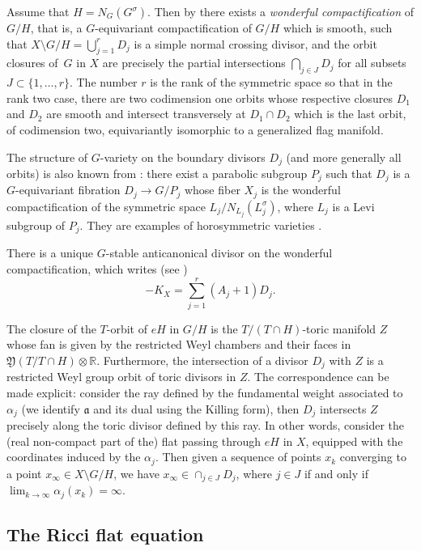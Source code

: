 \documentclass[JEP,XML,SOM,Unicode, NoEqCountersInSection, NoFloatCountersInSection]{cedram}
\theoremstyle{plain}
\theoremstyle{definition}
\begin{document}
Assume that $H=N_G(G^{\sigma})$. Then by \cite{DCP83} there exists a \emph{wonderful compactification} of
$G/H$, that is, a $G$-equivariant compactification of $G/H$ which is smooth, such that
$X\setminus G/H= \bigcup_{j=1}^r D_j$ is a simple normal crossing divisor, and
the orbit closures of~$G$ in $X$ are precisely the partial intersections $\bigcap_{j\in J} D_j$
for all subsets $J\subset \{1,\ldots,r\}$.
The number $r$ is the rank of the symmetric space so that in the rank two case,
there are two codimension one orbits whose respective closures $D_1$ and $D_2$ are smooth and
intersect transversely at $D_1\cap D_2$ which is the last orbit, of codimension two, equivariantly
isomorphic to a generalized flag manifold.

The structure of $G$-variety on the boundary divisors $D_j$ (and more generally all orbits)
is also known from \cite{DCP83}: there exist a parabolic subgroup $P_j$ such that
$D_j$ is a $G$-equivariant fibration $D_j\to G/P_j$ whose fiber $X_j$ is the
wonderful compactification of the symmetric space $L_j/N_{L_j}(L_j^{\sigma})$,
where $L_j$ is a Levi subgroup of $P_j$. They are examples of horosymmetric
varieties \cite{DelHoro}.

There is a unique $G$-stable anticanonical divisor on the wonderful compactification,
which writes (see \eg \cite{Ruz12})
\[ -K_X= \sum_{j=1}^r (A_j+1)D_j. \]

The closure of the $T$-orbit of $eH$ in $G/H$ is the $T/(T\cap H)$-toric manifold $Z$
whose fan is given by the restricted Weyl chambers and their faces in
$\mathfrak{Y}(T/T\cap H)\otimes \mathbb{R}$. Furthermore, the intersection of a
divisor $D_j$ with $Z$ is a restricted Weyl group orbit of toric divisors in $Z$.
The correspondence can be made explicit: consider the ray defined by the fundamental
weight associated to $\alpha_j$ (we identify $\mathfrak{a}$ and its dual using the
Killing form), then $D_j$ intersects $Z$ precisely along the
toric divisor defined by this ray.
In other words, consider the (real non-compact part of the) flat passing
through $eH$ in $X$, equipped with the coordinates induced by the $\alpha_j$. Then
given a sequence of points $x_k$ converging to a point $x_{\infty}\in X\setminus G/H$,
we have $x_{\infty}\in \cap_{j\in J} D_j$, where $j\in J$ if and only if
$\lim_{k\to \infty}\alpha_j(x_k)= \infty$.

\subsection{The Ricci flat equation}
\end{document}
